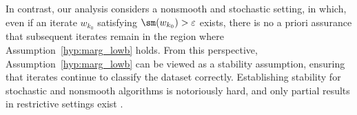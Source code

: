 In contrast, our analysis considers a nonsmooth and stochastic setting, in which, even if an iterate $w_{k_0}$ satisfying $\sm(w_{k_0}) > \varepsilon$ exists, there is no a priori assurance that subsequent iterates remain in the region where Assumption~\ref{hyp:marg_lowb} holds. From this perspective, Assumption~\ref{hyp:marg_lowb} can be viewed as a stability assumption, ensuring that iterates continue to classify the dataset correctly. Establishing stability for stochastic and nonsmooth algorithms is notoriously hard, and only partial results in restrictive settings exist \cite{borkar2000ode,ramaswamy2017generalization,josz2024global}.


